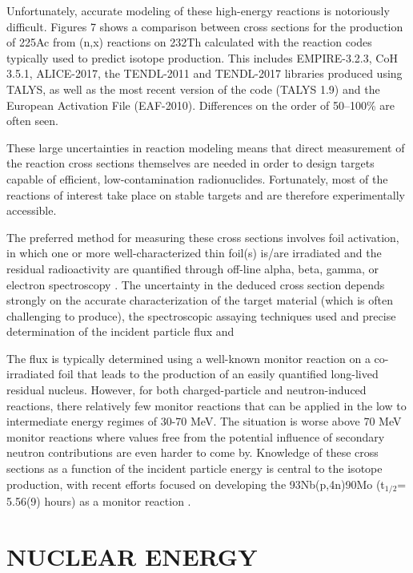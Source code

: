 \documentclass[letterpaper,draft]{ar-1col}
\begin{document}
Unfortunately, accurate modeling of these high-energy reactions is notoriously difficult.  Figures 7 shows a comparison between cross sections for the production of 225Ac from (n,x) reactions on 232Th calculated with the reaction codes typically used to predict isotope production.  This includes EMPIRE-3.2.3, CoH 3.5.1, ALICE-2017, the TENDL-2011 and TENDL-2017 libraries produced using TALYS, as well as the most recent version of the code (TALYS 1.9) \cite{cite-talys} and the European Activation File (EAF-2010).  Differences on the order of 50--100\% are often seen.  

These large uncertainties in reaction modeling means that direct measurement of the reaction cross sections themselves are needed in order to design targets capable of efficient, low-contamination radionuclides.  Fortunately, most of the reactions of interest take place on stable targets and are therefore experimentally accessible. 

The preferred method for measuring these cross sections involves foil activation, in which one or more well-characterized thin foil(s) is/are irradiated and the residual radioactivity are quantified through off-line alpha, beta, gamma, or electron spectroscopy \cite{Gra16, Voy18b}.  The uncertainty in the deduced cross section depends strongly on the accurate characterization of the target material (which is often challenging to produce), the spectroscopic assaying techniques used and precise determination of the incident particle flux and 


The flux is typically determined using a well-known monitor reaction on a co-irradiated foil that leads to the production of an easily quantified long-lived residual nucleus. However, for both charged-particle and neutron-induced reactions, there relatively few monitor reactions that can be applied in the low to intermediate energy regimes of 30-70 MeV.  The situation is worse above 70 MeV monitor reactions where values free from the potential influence of secondary neutron contributions are even harder to come by.  Knowledge of these cross sections as a function of the incident particle energy is central to the isotope production, with recent efforts focused on developing the 93Nb(p,4n)90Mo (t$_{1/2}$= 5.56(9) hours) as a monitor reaction \cite{Voy18b, Kim18}.  


\section{NUCLEAR ENERGY}
\end{document}
